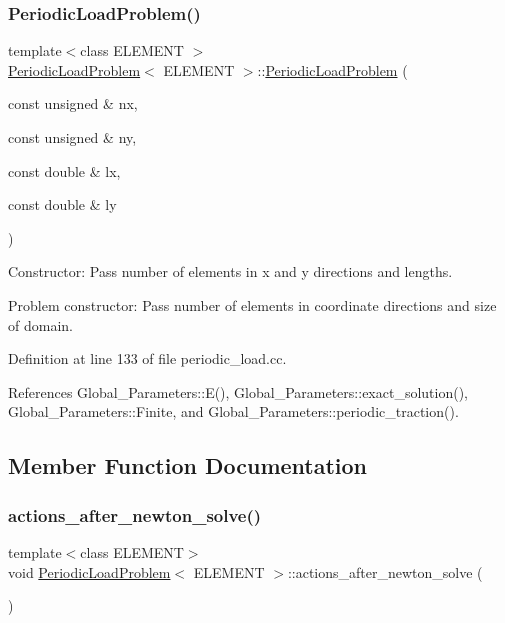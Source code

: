 \subsubsection{\texorpdfstring{Periodic\+Load\+Problem()}{PeriodicLoadProblem()}}
{\footnotesize\ttfamily template$<$class E\+L\+E\+M\+E\+NT $>$ \\
\hyperlink{classPeriodicLoadProblem}{Periodic\+Load\+Problem}$<$ E\+L\+E\+M\+E\+NT $>$\+::\hyperlink{classPeriodicLoadProblem}{Periodic\+Load\+Problem} (\begin{DoxyParamCaption}\item[{const unsigned \&}]{nx,  }\item[{const unsigned \&}]{ny,  }\item[{const double \&}]{lx,  }\item[{const double \&}]{ly }\end{DoxyParamCaption})}



Constructor\+: Pass number of elements in x and y directions and lengths. 

Problem constructor\+: Pass number of elements in coordinate directions and size of domain. 

Definition at line 133 of file periodic\+\_\+load.\+cc.



References Global\+\_\+\+Parameters\+::\+E(), Global\+\_\+\+Parameters\+::exact\+\_\+solution(), Global\+\_\+\+Parameters\+::\+Finite, and Global\+\_\+\+Parameters\+::periodic\+\_\+traction().



\subsection{Member Function Documentation}
\mbox{\label{classPeriodicLoadProblem_aad99d153549e1ec0b5504e486039ef5e}} 
\subsubsection{\texorpdfstring{actions\+\_\+after\+\_\+newton\+\_\+solve()}{actions\_after\_newton\_solve()}}
{\footnotesize\ttfamily template$<$class E\+L\+E\+M\+E\+NT$>$ \\
void \hyperlink{classPeriodicLoadProblem}{Periodic\+Load\+Problem}$<$ E\+L\+E\+M\+E\+NT $>$\+::actions\+\_\+after\+\_\+newton\+\_\+solve (\begin{DoxyParamCaption}{ }\end{DoxyParamCaption})\hspace{0.3cm}{\ttfamily [inline]}}



